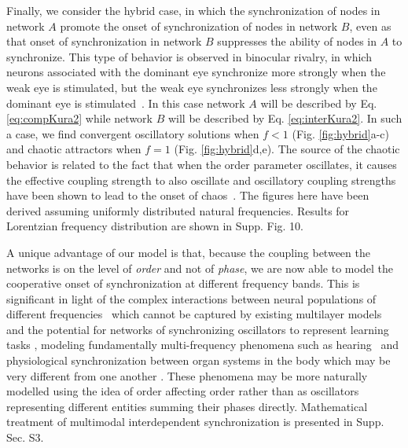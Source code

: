 \documentclass[pre,twocolumn,superscriptaddress]{revtex4}
\newcommand{\1}{\mathds{1}}
\begin{document}
{Finally, we consider the hybrid case, in which the synchronization of nodes in network $A$ promote the onset of synchronization of nodes in network $B$, even as that onset of synchronization in network $B$ suppresses the ability of nodes in $A$ to  synchronize. This type of behavior is observed in binocular rivalry, in which neurons associated with the dominant eye synchronize more strongly when the weak eye is stimulated, but the weak eye synchronizes less strongly when the dominant eye is stimulated~\cite{fries-pnas1997}.
In this case network $A$ will be described by Eq. \eqref{eq:compKura2} while network $B$ will be described by Eq.  \eqref{eq:interKura2}. In such a case, we find convergent oscillatory solutions when $f<1$ (Fig. \ref{fig:hybrid}a-c) and chaotic attractors when $f=1$ (Fig. \ref{fig:hybrid}d,e). The source of the chaotic behavior is related to the fact that when the order parameter oscillates, it causes the effective coupling strength to also oscillate and oscillatory coupling strengths have been shown to lead to the onset of chaos~\cite{so-chaos2011}.
The figures here have been derived assuming uniformly distributed natural frequencies.  Results for Lorentzian frequency distribution are shown in Supp. Fig. 10.


A unique advantage of our model is that, because the coupling between the networks is on the level of \textit{order} and not of \textit{phase}, we are now able to model the cooperative onset of synchronization at different frequency bands.
This is significant in light of the complex interactions between neural populations of different frequencies~\cite{gans-prl2009,lowet-ploscompbio2015} which cannot be captured by existing multilayer models 
and the potential for networks of synchronizing oscillators to represent learning tasks \cite{reichert-preprint2013}, modeling fundamentally multi-frequency phenomena such as hearing~\cite{wang-frontiersofphysics2016} and physiological synchronization between organ systems in the body which may be very different from one another \cite{amir-naturecomm2012,ivanov-newjphysics2016}.
These phenomena may be more naturally modelled using the idea of order affecting order rather than as oscillators representing different entities summing their phases directly.
Mathematical treatment of multimodal interdependent synchronization is presented in Supp. Sec. S3.

}
\end{document}
